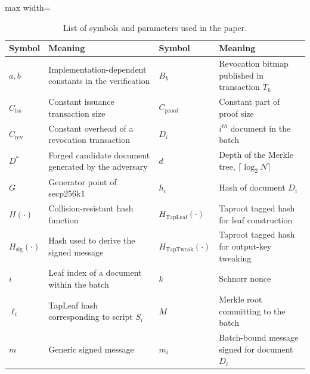 \begin{table}[htbp]
\centering
\caption{List of symbols and parameters used in the paper.}
\label{tab:notation}

\footnotesize
\renewcommand{\arraystretch}{1.15}

\begin{adjustbox}{max width=\linewidth}
\begin{tabular}{
>{\raggedright\arraybackslash}m{2.8cm}
>{\raggedright\arraybackslash}m{5.2cm}
>{\raggedright\arraybackslash}m{2.8cm}
>{\raggedright\arraybackslash}m{5.2cm}
}
\toprule
\textbf{Symbol} & \textbf{Meaning} & \textbf{Symbol} & \textbf{Meaning} \\
\midrule

$a,b$ & Implementation-dependent constants in the verification
& $B_k$ & Revocation bitmap published in transaction $T_k$ \\

$C_{\mathrm{iss}}$ & Constant issuance transaction size
& $C_{\mathrm{proof}}$ & Constant part of proof size \\

$C_{\mathrm{rev}}$ & Constant overhead of a revocation transaction
& $D_i$ & $i^{th}$ document in the batch \\

$D^*$ & Forged candidate document generated by the adversary
& $d$ & Depth of the Merkle tree, $\lceil \log_2 N \rceil$ \\

$G$ & Generator point of secp256k1
& $h_i$ & Hash of document $D_i$ \\

$H(\cdot)$ & Collision-resistant hash function
& $H_{\text{TapLeaf}}(\cdot)$ & Taproot tagged hash for leaf construction \\

$H_{\mathrm{sig}}(\cdot)$ & Hash used to derive the signed message
& $H_{\text{TapTweak}}(\cdot)$ & Taproot tagged hash for output-key tweaking \\

$i$ & Leaf index of a document within the batch
& $k$ & Schnorr nonce \\

$\ell_i$ & TapLeaf hash corresponding to script $S_i$
& $M$ & Merkle root committing to the batch \\

$m$ & Generic signed message
& $m_i$ & Batch-bound message signed for document $D_i$ \\


\end{tabular}
\end{adjustbox}
\end{table}
